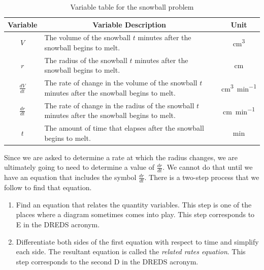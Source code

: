 \documentclass[12pt,]{book}
\newcommand{\acronym}[1]{#1}
\theoremstyle{plain}
\theoremstyle{definition}
\numberwithin{equation}{section}
\newcommand{\lz}[2]{\frac{d#1}{d#2}}
\begin{document}
\begin{table}
\centering
\caption{Variable table for the snowball problem\label{table-snowball}}
\begin{tabular}{cp{3.5in}c}
\toprule
Variable&\multicolumn{1}{c}{Variable Description}&Unit\\
\midrule
\(V\)&The volume of the snowball \(t\) minutes after the snowball begins to melt.&\si{\centi\meter\tothe{3}}\\
\midrule
\(r\)&The radius of the snowball \(t\) minutes after the snowball begins to melt.&\si{\centi\meter}\\
\midrule
\(\lz{V}{t}\)&The rate of change in the volume of the snowball \(t\) minutes after the snowball begins to melt.&\si{\centi\meter\tothe{3}\per\minute}\\
\midrule
\(\lz{r}{t}\)&The rate of change in the radius of the snowball \(t\) minutes after the snowball begins to melt.&\si{\centi\meter\per\minute}\\
\midrule
\(t\)&The amount of time that elapses after the snowball begins to melt.&\si{\minute}\\
\bottomrule
\end{tabular}
\end{table}
\par
Since we are asked to determine a rate at which the radius changes, we are ultimately going to need to determine a value of \(\lz{r}{t}\). We cannot do that until we have an equation that includes the symbol \(\lz{r}{t}\). There is a two-step process that we follow to find that equation.%
\begin{enumerate}
\item{}Find an equation that relates the quantity variables. This step is one of the places where a diagram sometimes comes into play. This step corresponds to \acronym{E} in the \acronym{DREDS} acronym.\item{}Differentiate both sides of the first equation with respect to time and simplify each side. The resultant equation is called the \emph{related rates equation}. This step corresponds to the second \acronym{D} in the \acronym{DREDS} acronym.\end{enumerate}
\par
\end{document}
